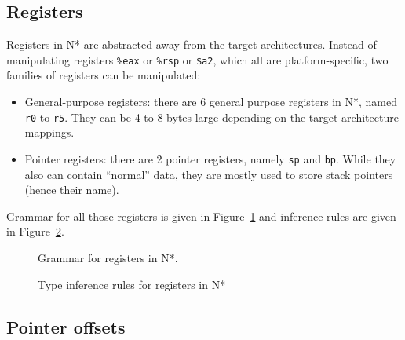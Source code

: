 \subsection{Registers}\label{subsec:nstar-common-expressions-registers}

Registers in N* are abstracted away from the target architectures.
Instead of manipulating registers \texttt{\%eax} or \texttt{\%rsp} or \texttt{\$a2}, which all are platform-specific, two families of registers can be manipulated:
\begin{itemize}
  \item General-purpose registers: there are 6 general purpose registers in N*, named \texttt{r0} to \texttt{r5}.
        They can be 4 to 8 bytes large depending on the target architecture mappings.
  \item Pointer registers: there are 2 pointer registers, namely \texttt{sp} and \texttt{bp}.
        While they also can contain ``normal'' data, they are mostly used to store stack pointers (hence their name).
\end{itemize}

Grammar for all those registers is given in Figure~\ref{fig:nstar-common-expressions-registers-grammar} and inference rules are given in Figure~\ref{fig:nstar-common-expressions-registers-typerules}.

\begin{figure}[htb]
  \centering


  \caption{Grammar for registers in N*.}
  \label{fig:nstar-common-expressions-registers-grammar}
\end{figure}

\begin{figure}[htb]
  \centering

  \begin{prooftree}
  \end{prooftree}

  \caption{Type inference rules for registers in N*}
  \label{fig:nstar-common-expressions-registers-typerules}
\end{figure}

\subsection{Pointer offsets}\label{fig:nstar-common-expressions-pointeroffsets}

